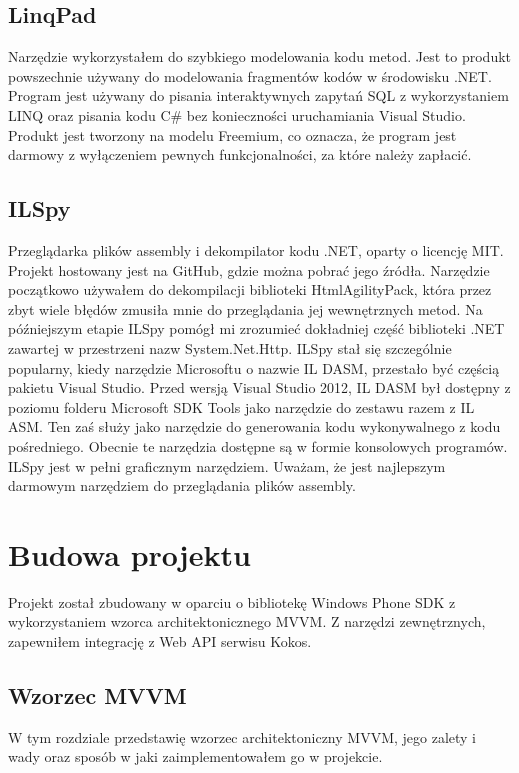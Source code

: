 \documentclass[a4paper,twoside,titlepage,openright]{book}
\begin{document}
\section{LinqPad}
Narzędzie wykorzystałem do szybkiego modelowania kodu metod. Jest to produkt powszechnie używany do modelowania fragmentów kodów w środowisku .NET. Program jest używany do pisania interaktywnych zapytań SQL z wykorzystaniem LINQ oraz pisania kodu C\# bez konieczności uruchamiania Visual Studio. \cite{linqPad} Produkt jest tworzony na modelu Freemium, co oznacza, że program jest darmowy z wyłączeniem pewnych funkcjonalności, za które należy zapłacić. \cite{linqPadWiki}



\section{ILSpy}
Przeglądarka plików assembly i dekompilator kodu .NET, oparty o licencję MIT. Projekt hostowany jest na GitHub, gdzie można pobrać jego źródła. \cite{ilSpyRepo} Narzędzie początkowo używałem do dekompilacji biblioteki HtmlAgilityPack, która przez zbyt wiele błędów zmusiła mnie do przeglądania jej wewnętrznych metod. Na późniejszym etapie ILSpy pomógł mi zrozumieć dokładniej część biblioteki .NET zawartej w przestrzeni nazw System.Net.Http. ILSpy stał się szczególnie popularny, kiedy narzędzie Microsoftu o nazwie IL DASM, przestało być częścią pakietu Visual Studio. Przed wersją Visual Studio 2012, IL DASM był dostępny z poziomu folderu Microsoft SDK Tools jako narzędzie do zestawu razem z IL ASM. Ten zaś służy jako narzędzie do generowania kodu wykonywalnego z kodu pośredniego. Obecnie te narzędzia dostępne są w formie konsolowych programów. ILSpy jest w pełni graficznym narzędziem. Uważam, że jest najlepszym darmowym narzędziem do przeglądania plików assembly.

 

\chapter{Budowa projektu}
Projekt został zbudowany w oparciu o bibliotekę Windows Phone SDK z wykorzystaniem wzorca architektonicznego MVVM. Z narzędzi zewnętrznych, zapewniłem integrację z Web API serwisu Kokos.

\section{Wzorzec MVVM}
W tym rozdziale przedstawię wzorzec architektoniczny MVVM, jego zalety i wady oraz sposób w jaki zaimplementowałem go w projekcie.
\end{document}
